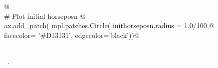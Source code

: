 \documentclass[11.5pt]{report}
\begin{document}
\begin{flushleft}
\begin{minipage}{\linewidth}
\begin{list}{}{}
\mbox{}\verb@    @\\
\mbox{}\verb@    # Plot initial horseposn @\\
\mbox{}\verb@    ax.add_patch( mpl.patches.Circle( inithorseposn,radius = 1.0/100,@\\
\mbox{}\verb@                                    facecolor= '#D13131', edgecolor='black'))@\\
\mbox{}\verb@@\\
\mbox{}\verb@@{\NWsep}
\end{list}
\vspace{-1.5ex}
\footnotesize
\begin{list}{}{\setlength{\itemsep}{-\parsep}\setlength{\itemindent}{-\leftmargin}}
\item \NWtxtMacroRefIn\ .

\item{}
\end{list}
\end{minipage}\vspace{4ex}
\end{flushleft}
\end{document}
